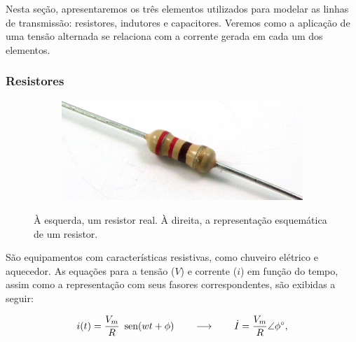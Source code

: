 Nesta seção, apresentaremos os três elementos utilizados para modelar as linhas de transmissão: resistores, indutores e capacitores. Veremos como a aplicação de uma tensão alternada se relaciona com a corrente gerada em cada um dos elementos. 

\subsubsection*{Resistores}


\begin{figure}
    \centering
    \begin{subfigure}[b]{0.3\textwidth}
        \centering
        \includegraphics[width=\textwidth]{anexos/resistor.png}
    \end{subfigure}
    \hspace{1cm}
    \begin{subfigure}[b]{0.3\textwidth}
        \centering
    \end{subfigure}
    

    \caption{À esquerda, um resistor real. À direita, a representação esquemática de um resistor.}
    \label{fig:three graphs}
\end{figure}


São equipamentos com características resistivas, como chuveiro elétrico
e aquecedor. As equações para a tensão ($V$) e corrente ($i$) em
função do tempo, assim como a representação com seus fasores correspondentes,
são exibidas a seguir:

\[
i(t)=\frac{V_{m}}{R}\mbox{\, sen}(wt+\phi)\qquad\longrightarrow\qquad\dot{I}=\frac{V_{m}}{R}\angle\phi^{\circ},
\]


